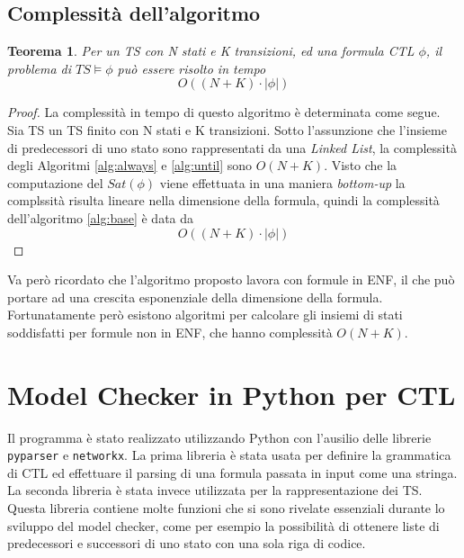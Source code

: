 \documentclass[a4paper, 10pt]{article}
\newtheorem{theor}{Teorema}[section]
\numberwithin{equation}{theor}
\begin{document}



\subsection{Complessità dell'algoritmo}
\begin{theor}
Per un \acf{TS} con N stati e K transizioni, ed una formula CTL $\phi$, il problema di $TS \models \phi$ può essere risolto in tempo $$O((N+K) \cdot |\phi|)$$
\end{theor}
\begin{proof}
La complessità in tempo di questo algoritmo è determinata come segue. Sia \ac{TS} un \acf{TS} finito con N stati e K transizioni. Sotto l'assunzione che l'insieme di predecessori di uno stato sono rappresentati da una \textit{Linked List}, la complessità degli Algoritmi \ref{alg:always} e \ref{alg:until} sono $O(N+K)$. Visto che la computazione del $Sat(\phi)$ viene effettuata in una maniera \textit{bottom-up} la complssità risulta lineare nella dimensione della formula, quindi la complessità dell'algoritmo \ref{alg:base} è data da $$O((N+K) \cdot |\phi|) $$
\end{proof}
Va però ricordato che l'algoritmo proposto lavora con formule in \ac{ENF}, il che può portare ad una crescita esponenziale della dimensione della formula. Fortunatamente però esistono algoritmi per calcolare gli insiemi di stati soddisfatti per formule non in ENF, che hanno complessità $O(N+K)$.

\section{Model Checker in Python per \ac{CTL}}
Il programma è stato realizzato utilizzando Python con l'ausilio delle librerie \texttt{pyparser} e \texttt{networkx}. La prima libreria è stata usata per definire la grammatica di \ac{CTL} ed effettuare il parsing di una formula passata in input come una stringa.
La seconda libreria è stata invece utilizzata per la rappresentazione dei \ac{TS}. Questa libreria contiene molte funzioni che si sono rivelate essenziali durante lo sviluppo del model checker, come per esempio la possibilità di ottenere liste di predecessori e successori di uno stato con una sola riga di codice.
\end{document}
